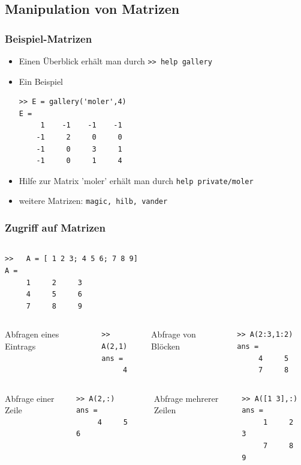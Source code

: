 \subsection{Manipulation von Matrizen}
%
%
\begin{frame}[fragile]\frametitle{Beispiel-Matrizen}
\begin{itemize}
\item Einen Überblick erhält man durch \lstinline!>> help gallery!
\item Ein Beispiel
\begin{lstlisting}
>> E = gallery('moler',4)
E =
     1    -1    -1    -1
    -1     2     0     0
    -1     0     3     1
    -1     0     1     4
\end{lstlisting}
\item Hilfe zur Matrix 'moler' erhält man durch \lstinline!help private/moler!
\item weitere Matrizen: \lstinline!magic, hilb, vander!
\end{itemize}
\end{frame}
%
%
\begin{frame}[fragile]\frametitle{Zugriff auf Matrizen}
\begin{columns}[c]%
%
\begin{lstlisting}[basicstyle=\tiny]
>>   A = [ 1 2 3; 4 5 6; 7 8 9]
A =
     1     2     3
     4     5     6
     7     8     9
\end{lstlisting}%
\end{columns}%
\begin{columns}[t,onlytextwidth]
Abfragen eines Eintrags
\begin{lstlisting}
>> A(2,1)
ans =
     4
\end{lstlisting}
Abfrage von Blöcken
\begin{lstlisting}
>> A(2:3,1:2)
ans =
     4     5     
     7     8     
\end{lstlisting}
\end{columns}
\begin{columns}[t,onlytextwidth]
Abfrage einer Zeile
\begin{lstlisting}
>> A(2,:)
ans =
     4     5     6
\end{lstlisting}
Abfrage mehrerer Zeilen
\begin{lstlisting}
>> A([1 3],:)
ans =
     1     2     3
     7     8     9
\end{lstlisting}
\end{columns}
\end{frame}
